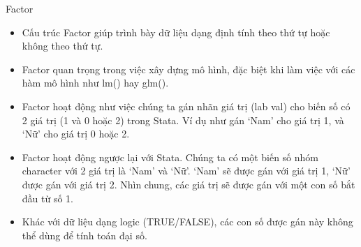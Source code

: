 \documentclass[
  ignorenonframetext,
]{beamer}
\begin{document}
\begin{frame}{Factor}
\protect\hypertarget{factor}{}

\begin{itemize}[<+->]
\item
  Cấu trúc Factor giúp trình bày dữ liệu dạng định tính theo thứ tự hoặc
  không theo thứ tự.
\item
  Factor quan trọng trong việc xây dựng mô hình, đặc biệt khi làm việc
  với các hàm mô hình như lm() hay glm().
\item
  Factor hoạt động như việc chúng ta gán nhãn giá trị (lab val) cho biến
  số có 2 giá trị (1 và 0 hoặc 2) trong Stata. Ví dụ như gán `Nam' cho
  giá trị 1, và `Nữ' cho giá trị 0 hoặc 2.
\item
  Factor hoạt động ngược lại với Stata. Chúng ta có một biến số nhóm
  character với 2 giá trị là `Nam' và `Nữ'. `Nam' sẽ được gán với giá
  trị 1, `Nữ' được gán với giá trị 2. Nhìn chung, các giá trị sẽ được
  gán với một con số bắt đầu từ số 1.
\item
  Khác với dữ liệu dạng logic (TRUE/FALSE), các con số được gán này
  không thể dùng để tính toán đại số.
\end{itemize}

\end{frame}
\end{document}
